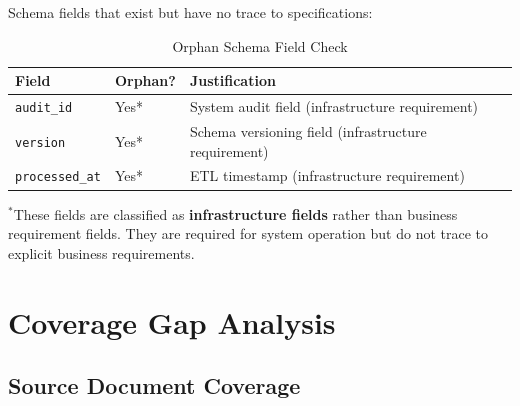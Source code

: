 \documentclass[11pt,a4paper,twoside]{report}
\newcommand{\fieldref}[1]{\textcolor{sapblue}{\texttt{#1}}}
\begin{document}
Schema fields that exist but have no trace to specifications:

\begin{table}[h]
\centering
\caption{Orphan Schema Field Check}
\label{tab:orphan-schema-fields}
\begin{tabular}{@{}L{5cm}C{2cm}L{6.5cm}@{}}
\toprule
\textbf{Field} & \textbf{Orphan?} & \textbf{Justification} \\
\midrule
\fieldref{audit\_id} & Yes* & System audit field (infrastructure requirement) \\
\fieldref{version} & Yes* & Schema versioning field (infrastructure requirement) \\
\fieldref{processed\_at} & Yes* & ETL timestamp (infrastructure requirement) \\
\bottomrule
\end{tabular}
\end{table}

$^*$These fields are classified as \textbf{infrastructure fields} rather than
business requirement fields. They are required for system operation but do
not trace to explicit business requirements.

\section{Coverage Gap Analysis}
\label{sec:coverage-gap-analysis}

\subsection{Source Document Coverage}
\end{document}
